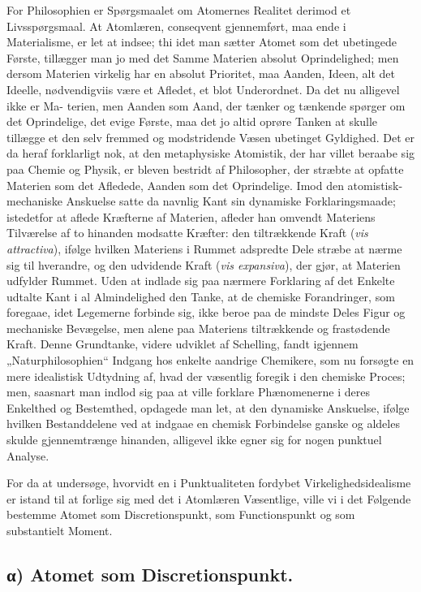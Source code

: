 \documentclass[12pt,a4paper]{book}
\begin{document}
For Philosophien er Spørgsmaalet om Atomernes
Realitet derimod et Livsspørgsmaal. At Atomlæren, conseqvent
gjennemført, maa ende i Materialisme, er let at indsee; thi
idet man sætter Atomet som det ubetingede Første, tillægger
man jo med det Samme Materien absolut Oprindelighed;
men dersom Materien virkelig har en absolut Prioritet, maa
Aanden, Ideen, alt det Ideelle, nødvendigviis være et Afledet,
et blot Underordnet. Da det nu alligevel ikke er Ma-
terien, men Aanden som Aand, der tænker og tænkende spørger
om det Oprindelige, det evige Første, maa det jo altid
oprøre Tanken at skulle tillægge et den selv fremmed og
modstridende Væsen ubetinget Gyldighed. Det er da heraf
forklarligt nok, at den metaphysiske Atomistik, der har villet
beraabe sig paa Chemie og Physik, er bleven bestridt af
Philosopher, der stræbte at opfatte Materien som det Afledede,
Aanden som det Oprindelige. Imod den atomistisk-mechaniske
Anskuelse satte da navnlig Kant sin dynamiske
Forklaringsmaade; istedetfor at aflede Kræfterne af Materien, afleder
han omvendt Materiens Tilværelse af to hinanden modsatte
Kræfter: den tiltrækkende Kraft (\textit{vis attractiva}), ifølge hvilken
Materiens i Rummet adspredte Dele stræbe at nærme sig til
hverandre, og den udvidende Kraft (\textit{vis expansiva}), der gjør,
at Materien udfylder Rummet. Uden at indlade sig paa
nærmere Forklaring af det Enkelte udtalte Kant i al
Almindelighed den Tanke, at de chemiske Forandringer, som
foregaae, idet Legemerne forbinde sig, ikke beroe paa de mindste
Deles Figur og mechaniske Bevægelse, men alene paa
Materiens tiltrækkende og frastødende Kraft. Denne Grundtanke,
videre udviklet af Schelling, fandt igjennem „Naturphilosophien“
Indgang hos enkelte aandrige Chemikere, som
nu forsøgte en mere idealistisk Udtydning af, hvad der
væsentlig foregik i den chemiske Proces; men, saasnart man indlod
sig paa at ville forklare Phænomenerne i deres Enkelthed og
Bestemthed, opdagede man let, at den dynamiske Anskuelse,
ifølge hvilken Bestanddelene ved at indgaae en chemisk
Forbindelse ganske og aldeles skulde gjennemtrænge hinanden,
alligevel ikke egner sig for nogen punktuel Analyse.

For da at undersøge, hvorvidt en i Punktualiteten
fordybet Virkelighedsidealisme er istand til at forlige sig med
det i Atomlæren Væsentlige, ville vi i det Følgende bestemme
Atomet som Discretionspunkt, som Functionspunkt og som
substantielt Moment.
\subsection*{α) Atomet som Discretionspunkt.}
\end{document}
